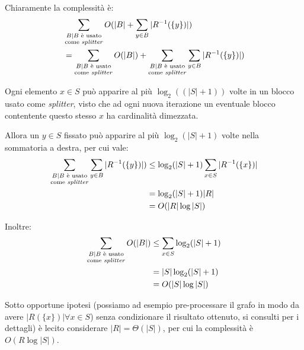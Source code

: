 \begin{proof2}
    Chiaramente la complessità è:
    \begin{align*}
        \displaystyle &\sum_{\substack{B \mid B \text{ è usato}\\\text{come \emph{splitter}}}} O(|B| + \sum_{y \in B} |R^{-1}(\{y\})|)\\
        &= \sum_{\substack{B \mid B \text{ è usato}\\\text{come \emph{splitter}}}} O(|B|) + \sum_{\substack{B \mid B \text{ è usato}\\\text{come \emph{splitter}}}} \sum_{y \in B} |R^{-1}(\{y\})|)
    \end{align*}

    \begin{observation}
        Ogni elemento $x \in S$ può apparire al più $\log_2 ((|S| + 1))$ volte in un blocco usato come \emph{splitter}, visto che ad ogni nuova iterazione un eventuale blocco contentente questo stesso $x$ ha cardinalità dimezzata.
    \end{observation}

    Allora un $y \in S$ fissato può apparire al più $\log_2 (|S| + 1)$ volte nella sommatoria a destra, per cui vale:
    \begin{align*}
        \sum_{\substack{B \mid B \text{ è usato}\\\text{come \emph{splitter}}}} \sum_{y \in B} |R^{-1}(\{y\})|) &\leq \log_2 (|S|+1) \sum_{x \in S} |R^{-1}(\{x\})|\\
        &= \log_2 (|S|+1) |R|\\
        &= O(|R|\log |S|)
    \end{align*}

    Inoltre:
    \begin{align*}
        \sum_{\substack{B \mid B \text{ è usato}\\\text{come \emph{splitter}}}} O(|B|) &\leq \sum_{x \in S} \log_{2} (|S|+1)\\
        &= |S|\log_{2} (|S|+1)\\
        &= O(|S|\log |S|)
    \end{align*}

    Sotto opportune ipotesi (possiamo ad esempio pre-processare il grafo in modo da avere $|R(\{x\})| \forall x \in S$) senza condizionare il risultato ottenuto, si consulti \cite{paigetarjan} per i dettagli) è lecito considerare $|R| = \Theta(|S|)$, per cui la complessità è $O(R\log |S|)$.
\end{proof2}

